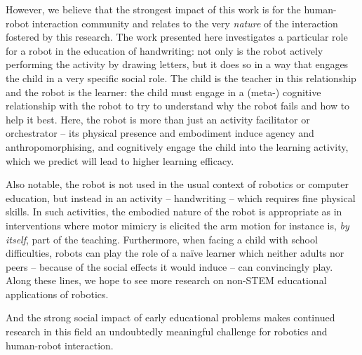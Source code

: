 \documentclass{sig-alternate}
\begin{document}
However, we believe that the strongest impact of this work is for the human-robot
interaction community and relates to the very \emph{nature} of the interaction
fostered by this research. The work presented here investigates a particular
role for a robot in the education of handwriting: not only is the robot actively
performing the activity by drawing letters, but it does so in a way that engages
the child in a very specific social role. The child is the teacher in this relationship and the robot is
the learner: the child must engage in a (meta-) cognitive relationship with the robot
to try to understand why the robot fails and how to help it best.  Here, the
robot is more than just an activity facilitator or orchestrator -- its physical presence
and embodiment induce agency and anthropomorphising, and cognitively engage the
child into the learning activity, which we predict will lead to higher learning
efficacy.

Also notable, the robot is not used in the usual context of robotics or computer
education, but instead in an activity -- handwriting -- which requires fine
physical skills. In such activities, the embodied nature of the robot is appropriate as in interventions where motor mimicry is elicited \cite{Berninger1997} the arm motion for instance is, \emph{by
itself}, part of the teaching. Furthermore, when facing a child with school 
difficulties, robots can play the role of a na\"ive learner which neither adults 
nor peers -- because of the social effects it would induce -- can convincingly 
play. Along these lines, we hope to see more research
on non-STEM educational applications of robotics.


And the strong social impact of early educational problems makes continued research in this field
an undoubtedly meaningful challenge for robotics and human-robot interaction.

\end{document}
